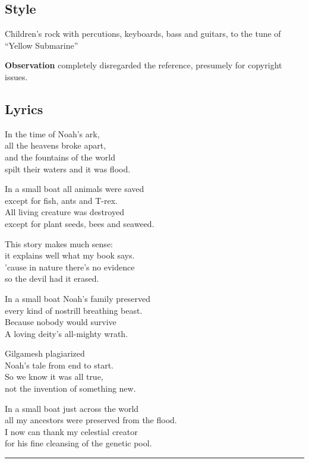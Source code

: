 \subsection{Style}\label{style-3}

Children's rock with percutions, keyboards, bass and guitars, to the
tune of ``Yellow Submarine''

\textbf{Observation} completely disregarded the reference, presumely for
copyright issues.

\subsection{Lyrics}\label{lyrics-3}

In the time of Noah's ark,\\
all the heavens broke apart,\\
and the fountains of the world\\
spilt their waters and it was flood.

In a small boat all animals were saved\\
except for fish, ants and T-rex.\\
All living creature was destroyed\\
except for plant seeds, bees and seaweed.

This story makes much sense:\\
it explains well what my book says.\\
'cause in nature there's no evidence\\
so the devil had it erased.

In a small boat Noah's family preserved\\
every kind of nostrill breathing beast.\\
Because nobody would survive\\
A loving deity's all-mighty wrath.

Gilgamesh plagiarized\\
Noah's tale from end to start.\\
So we know it was all true,\\
not the invention of something new.

In a small boat just across the world\\
all my ancestors were preserved from the flood.\\
I now can thank my celestial creator\\
for his fine cleansing of the genetic pool.

\begin{center}\rule{0.5\linewidth}{0.5pt}\end{center}

